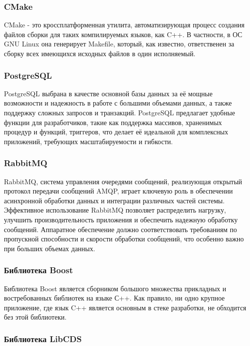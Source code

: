 \subsubsection{CMake}

CMake - это кроссплатформенная утилита, автоматизирующая процесс создания файлов сборки для таких компилируемых языков, как C++. В частности, в ОС GNU Linux она генерирует Makefile, который, как известно, ответственен за сборку всех имеющихся исходных файлов в один исполняемый. 

\subsubsection{PostgreSQL}

PostgreSQL выбрана в качестве основной базы данных за её мощные возможности и надежность в работе с большими объемами данных, а также поддержку сложных запросов и транзакций. PostgreSQL предлагает удобные функции для разработчиков, такие как поддержка массивов, храненимых процедур и функций, триггеров, что делает её идеальной для комплексных приложений, требующих масштабируемости и гибкости.

\subsubsection{RabbitMQ} 
RabbitMQ, система управления очередями сообщений, реализующая открытый протокол передачи сообщений AMQP, играет ключевую роль в обеспечении асинхронной обработки данных и интеграции различных частей системы. Эффективное использование RabbitMQ позволяет распределить нагрузку, улучшить производительность приложения и обеспечить надежную обработку сообщений. Аппаратное обеспечение должно соответствовать требованиям по пропускной способности и скорости обработки сообщений, что особенно важно при больших объемах данных.

\subsubsection{Библиотека Boost}

Библиотека Boost является сборником большого множества прикладных и востребованных библиотек на языке С++. Как правило, ни одно крупное приложение, где язык C++ является основным в стеке разработки, не обходится без этой библиотеки.
 
\subsubsection{Библиотека LibCDS}

